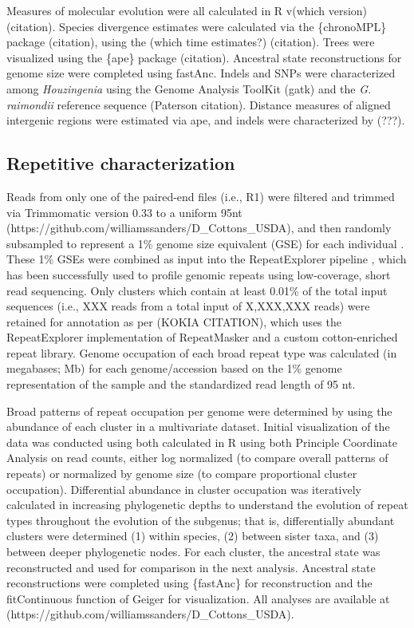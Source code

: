 \documentclass{bmcart}
\newcommand{\note}[2][]{\added[id=#1,remark={#2}]{}}
\begin{document}
Measures of molecular evolution were all calculated in R v(which version)(citation). Species divergence estimates were calculated via the \{chronoMPL\} package (citation), using the (which time estimates?) (citation). Trees were visualized using the \{ape\} package (citation). Ancestral state reconstructions for genome size were completed using {fastAnc}. Indels and SNPs were characterized among \textit{Houzingenia} using the Genome Analysis ToolKit (gatk) and the \textit{G. raimondii} reference sequence (Paterson citation). Distance measures of aligned intergenic regions were estimated via {ape}, and indels were characterized by (???). 

\subsection*{Repetitive characterization}
Reads from only one of the paired-end files (i.e., R1) were filtered and trimmed via Trimmomatic version 0.33 \cite{Bolger2014} to a uniform 95nt (https://github.com/williamssanders/D\_Cottons\_USDA), and then randomly subsampled to represent a 1\% genome size equivalent (GSE) for each individual \cite{Hendrix2005, Wendel2002}. These 1\% GSEs were combined as input into the RepeatExplorer pipeline \cite{Novak2013, Novak2010}, which has been successfully used to profile genomic repeats using low-coverage, short read sequencing. Only clusters which contain at least 0.01\% of the total input sequences (i.e., XXX \note[Corrinne]{numbers please}reads from a total input of X,XXX,XXX reads) were retained for annotation as per (KOKIA CITATION), which uses the RepeatExplorer implementation of RepeatMasker \cite{Smit2015} and a custom cotton-enriched repeat library. Genome occupation of each broad repeat type was calculated (in megabases; Mb) for each genome/accession based on the 1\% genome representation of the sample and the standardized read length of 95 nt. 

Broad patterns of repeat occupation per genome were determined by using the abundance of each cluster in a multivariate dataset. Initial visualization of the data was conducted using both calculated in R \note[Corrinne]{citation} using both Principle Coordinate Analysis on read counts, either log normalized (to compare overall patterns of repeats) or normalized by genome size (to compare proportional cluster occupation). Differential abundance in cluster occupation was iteratively calculated in increasing phylogenetic depths to understand the evolution of repeat types throughout the evolution of the subgenus; that is, differentially abundant clusters were determined (1) within species, (2) between sister taxa, and (3) between deeper phylogenetic nodes. For each cluster, the ancestral state was reconstructed and used for comparison in the next analysis. Ancestral state reconstructions were completed using \{fastAnc\} for reconstruction and the fitContinuous function of {Geiger} for visualization. All analyses are available at (https://github.com/williamssanders/D\_Cottons\_USDA).
\end{document}
